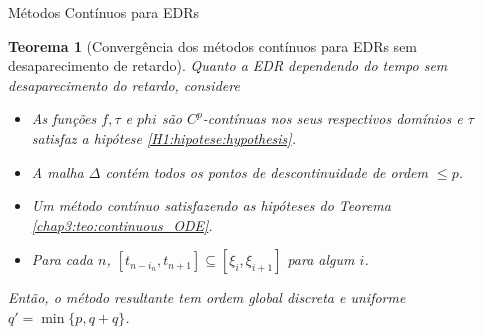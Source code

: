 \documentclass{beamer}
\theoremstyle{plain}
\newtheorem{teo}{Teorema}
\theoremstyle{definition}
\begin{document}

\begin{frame}{Métodos Contínuos para EDRs}
\begin{teo}[Convergência dos métodos contínuos para EDRs sem desaparecimento de retardo]
  \label{chap3:teo:DDE_method_1}
  Quanto a EDR dependendo do tempo sem desaparecimento do retardo, considere

  \begin{itemize}
      \item[$\bullet$] As funções $f, \tau$ e $phi$ são $C^p$-contínuas nos seus respectivos domínios e $\tau$ satisfaz a hipótese \ref{H1:hipotese:hypothesis}.

      \item[$\bullet$] A malha $\Delta$ contém todos os pontos de descontinuidade de ordem $\leq p$.

      \item[$\bullet$] Um método contínuo satisfazendo as hipóteses do Teorema \ref{chap3:teo:continuous_ODE}.

      \item[$\bullet$] Para cada $n$, $\left[t_{n-i_{n}}, t_{n+1}\right] \subseteq \left[\xi_{i}, \xi_{i+1}\right]$ para algum $i$.

  \end{itemize}

  Então, o método resultante tem ordem global discreta e uniforme $q' = \min\{p, q+q\}$.

  





\end{teo}
\end{frame}
\end{document}
